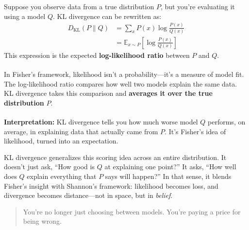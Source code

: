 \begin{example}[title=KL Divergence as Expected Log-Likelihood Ratio]
Suppose you observe data from a true distribution \( P \), but you're evaluating it using a model \( Q \). KL divergence can be rewritten as:
\begin{align*}
D_{\mathrm{KL}}(P \parallel Q) 
  &= \sum_x P(x) \log \frac{P(x)}{Q(x)} \\
  &= \mathbb{E}_{x \sim P} \left[ \log \frac{P(x)}{Q(x)} \right]
\end{align*}
This expression is the expected \textbf{log-likelihood ratio} between \( P \) and \( Q \). 
\ \\\ \\
In Fisher’s framework, likelihood isn’t a probability—it’s a measure of model fit. The log-likelihood ratio compares how well two models explain the same data. KL divergence takes this comparison and \textbf{averages it over the true distribution} \( P \).
\ \\\ \\
\textbf{Interpretation:} KL divergence tells you how much worse model \( Q \) performs, on average, in explaining data that actually came from \( P \). It’s Fisher’s idea of likelihood, turned into an expectation.
\end{example}

\vspace{1em}


KL divergence generalizes this scoring idea across an entire distribution. It doesn’t just ask, “How good is \( Q \) at explaining one point?” It asks, “How well does \( Q \) explain everything that \( P \) says will happen?” In that sense, it blends Fisher’s insight with Shannon’s framework: likelihood becomes loss, and divergence becomes distance—not in space, but in \emph{belief}.

\begin{quote}
You’re no longer just choosing between models. You’re paying a price for being wrong.
\end{quote}